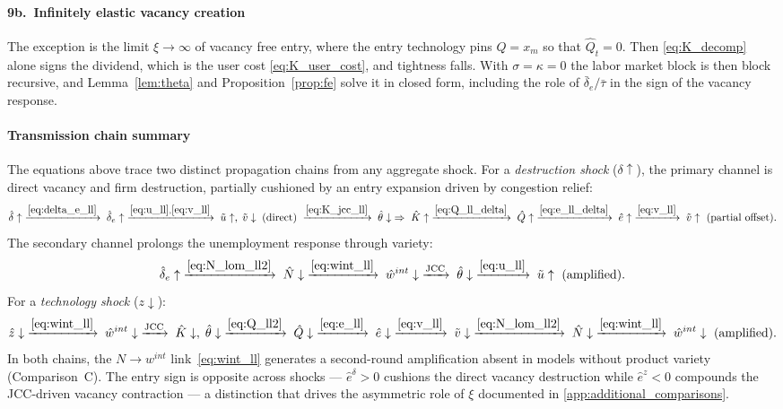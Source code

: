 \documentclass[authoryear, review, 12pt]{elsarticle}
\begin{document}
\paragraph{9b.\ Infinitely elastic vacancy creation}
The exception is the limit $\xi\to\infty$ of vacancy free entry, where the entry technology pins
$Q=x_m$ so that $\hat{Q}_t=0$. Then \eqref{eq:K_decomp} alone signs the dividend, which is
the user cost \eqref{eq:K_user_cost}, and tightness falls. With $\sigma=\kappa=0$ the labor
market block is then block recursive, and Lemma~\ref{lem:theta} and
Proposition~\ref{prop:fe} solve it in closed form, including the role of
$\bar\delta_e/\bar\tau$ in the sign of the vacancy response.

\paragraph{Transmission chain summary}
The equations above trace two distinct propagation chains from any aggregate
shock.  For a \emph{destruction shock} ($\delta\uparrow$), the primary
channel is direct vacancy and firm destruction, partially cushioned by an
entry expansion driven by congestion relief:
\begin{equation*}
    \hat\delta\uparrow
    \;\xrightarrow{\eqref{eq:delta_e_ll}}\; \hat\delta_e\uparrow
    \;\xrightarrow{\eqref{eq:u_ll},\eqref{eq:v_ll}}\; \tilde{u}\uparrow,\;\tilde{v}\downarrow\;\text{(direct)}
    \;\xrightarrow{\eqref{eq:K_jcc_ll}}\; \hat\theta\downarrow\;\Rightarrow\;\hat{K}\uparrow
    \;\xrightarrow{\eqref{eq:Q_ll_delta}}\; \hat{Q}\uparrow
    \;\xrightarrow{\eqref{eq:e_ll_delta}}\; \hat{e}\uparrow
    \;\xrightarrow{\eqref{eq:v_ll}}\; \tilde{v}\uparrow\text{ (partial offset)}.
\end{equation*}
The secondary channel prolongs the unemployment response through variety:
\begin{equation*}
    \hat\delta_e\uparrow
    \;\xrightarrow{\eqref{eq:N_lom_ll2}}\; \hat{N}\downarrow
    \;\xrightarrow{\eqref{eq:wint_ll}}\; \hat{w}^{int}\downarrow
    \;\xrightarrow{\text{JCC}}\; \hat\theta\downarrow
    \;\xrightarrow{\eqref{eq:u_ll}}\; \tilde{u}\uparrow\text{ (amplified)}.
\end{equation*}
For a \emph{technology shock} ($z\downarrow$):
\begin{equation*}
    \hat{z}\downarrow
    \;\xrightarrow{\eqref{eq:wint_ll}}\; \hat{w}^{int}\downarrow
    \;\xrightarrow{\text{JCC}}\; \hat{K}\downarrow,\;\hat\theta\downarrow
    \;\xrightarrow{\eqref{eq:Q_ll2}}\; \hat{Q}\downarrow
    \;\xrightarrow{\eqref{eq:e_ll}}\; \hat{e}\downarrow
    \;\xrightarrow{\eqref{eq:v_ll}}\; \tilde{v}\downarrow
    \;\xrightarrow{\eqref{eq:N_lom_ll2}}\; \hat{N}\downarrow
    \;\xrightarrow{\eqref{eq:wint_ll}}\; \hat{w}^{int}\downarrow\text{ (amplified)}.
\end{equation*}
In both chains, the $N\to w^{int}$ link~\eqref{eq:wint_ll} generates a
second-round amplification absent in models without product variety
(Comparison~C).  The entry sign is opposite across shocks ---
$\hat{e}^\delta>0$ cushions the direct vacancy destruction while
$\hat{e}^z<0$ compounds the JCC-driven vacancy contraction --- a
distinction that drives the asymmetric role of $\xi$ documented in
\ref{app:additional_comparisons}.
\end{document}
